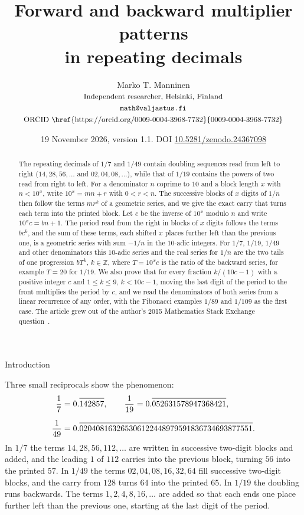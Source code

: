 \documentclass[11pt,a4paper]{amsart}
\title[Forward and backward multiplier patterns]{Forward and backward multiplier patterns\\in repeating decimals}
\author[Marko T. Manninen]{Marko T. Manninen\\[4pt]
  $\text{\normalfont\small Independent researcher, Helsinki, Finland}$\\
  $\text{\normalfont\small\texttt{math@valjastus.fi}}$\\
  $\text{\normalfont\small ORCID \href{https://orcid.org/0009-0004-3968-7732}{0009-0004-3968-7732}}$}
\date{19 November 2026, version 1.1. DOI \href{https://doi.org/10.5281/zenodo.24367098}{10.5281/zenodo.24367098}}
\makeatletter
\newcommand{\rep}[1]{\overline{\rule{0pt}{1.95ex}#1}}
\def\section{\@startsection{section}{1}%
  \z@{-.7\linespacing\@plus-\linespacing}{.5\linespacing}%
  {\normalfont\scshape\centering}}
\theoremstyle{definition}
\theoremstyle{remark}
\newcommand{\Z}{\mathbb{Z}}
\makeatother
\begin{document}
\begin{abstract}
The repeating decimals of $1/7$ and $1/49$ contain doubling sequences read
from left to right ($14, 28, 56, \dots$ and $02, 04, 08, \dots$), while that of
$1/19$ contains the powers of two read from right to left. For a denominator $n$ coprime to $10$ and a block length $x$ with $n < 10^x$, write
$10^x = mn + r$ with $0 < r < n$. The successive blocks of $x$ digits of $1/n$
then follow the terms $m r^k$ of a geometric series, and we give the exact carry
that turns each term into the printed block. Let $c$ be the inverse of $10^x$
modulo $n$ and write $10^x c = bn + 1$. The period read from the right in blocks
of $x$ digits follows the terms $b c^k$, and the sum of these terms, each shifted
$x$ places further left than the previous one, is a geometric series with sum
$-1/n$ in the $10$-adic integers. For $1/7$, $1/19$, $1/49$ and other
denominators this $10$-adic series and the real series for $1/n$ are the two
tails of one progression $bT^k$, $k \in \Z$, where $T = 10^x c$ is the ratio of
the backward series, for example $T = 20$ for $1/19$. We also prove that for
every fraction $k/(10c-1)$ with a positive integer $c$ and $1 \le k \le 9$, $k < 10c - 1$, moving the last digit of the
period to the front multiplies the period by $c$, and we read the denominators of both series from a linear recurrence of any
order, with the Fibonacci examples $1/89$ and $1/109$ as the first case. The article grew out of the author's 2015 Mathematics Stack Exchange
question~\cite{mse1365506}.
\end{abstract}

\maketitle

\section{Introduction}

Three small reciprocals show the phenomenon:
\begin{align}
\frac17 &= 0.\rep{142857}, \qquad \frac1{19} = 0.\rep{052631578947368421},\\[6pt]
\frac1{49} &= 0.\rep{020408163265306122448979591836734693877551}.
\end{align}
In $1/7$ the terms $14, 28, 56, 112, \dots$ are written in successive two-digit
blocks and added, and the leading $1$ of $112$ carries into the previous block,
turning $56$ into the printed $57$. In $1/49$ the terms $02, 04, 08, 16, 32, 64$
fill successive two-digit blocks, and the carry from $128$ turns $64$ into the
printed $65$. In $1/19$ the doubling runs backwards. The terms
$1, 2, 4, 8, 16, \dots$ are added so that each ends one place further left than
the previous one, starting at the last digit of the period.
\end{document}
